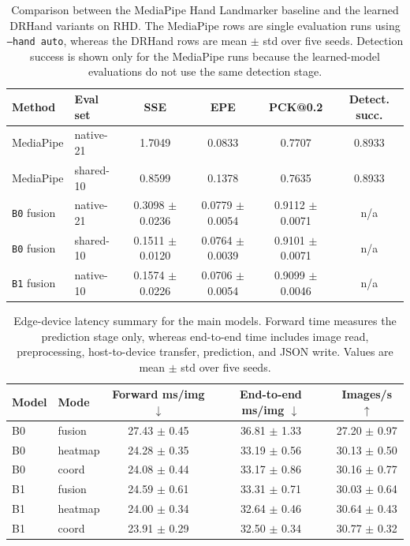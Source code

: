 \documentclass[10pt,letterpaper]{article}
\begin{document}
\begin{table}[H]
\centering
\footnotesize
\caption{Comparison between the MediaPipe Hand Landmarker baseline and the learned DRHand variants on RHD. The MediaPipe rows are single evaluation runs using \texttt{--hand auto}, whereas the DRHand rows are mean $\pm$ std over five seeds. Detection success is shown only for the MediaPipe runs because the learned-model evaluations do not use the same detection stage.}
\label{tab:mediapipe_baseline}
\begin{tabular}{llcccc}
\toprule
Method & Eval set & SSE & EPE & PCK@0.2 & Detect. succ. \\
\midrule
MediaPipe & native-21 & 1.7049 & 0.0833 & 0.7707 & 0.8933 \\
MediaPipe & shared-10 & 0.8599 & 0.1378 & 0.7635 & 0.8933 \\
\texttt{B0} fusion & native-21 & 0.3098 $\pm$ 0.0236 & 0.0779 $\pm$ 0.0054 & 0.9112 $\pm$ 0.0071 & n/a \\
\texttt{B0} fusion & shared-10 & 0.1511 $\pm$ 0.0120 & 0.0764 $\pm$ 0.0039 & 0.9101 $\pm$ 0.0071 & n/a \\
\texttt{B1} fusion & native-10 & 0.1574 $\pm$ 0.0226 & 0.0706 $\pm$ 0.0054 & 0.9099 $\pm$ 0.0046 & n/a \\
\bottomrule
\end{tabular}
\end{table}

\begin{table}[H]
\centering
\footnotesize
\caption{Edge-device latency summary for the main models. Forward time measures the prediction stage only, whereas end-to-end time includes image read, preprocessing, host-to-device transfer, prediction, and JSON write. Values are mean $\pm$ std over five seeds.}
\label{tab:latency}
\begin{tabular}{llccc}
\toprule
Model & Mode & Forward ms/img $\downarrow$ & End-to-end ms/img $\downarrow$ & Images/s $\uparrow$ \\
\midrule
B0 & fusion & 27.43 $\pm$ 0.45 & 36.81 $\pm$ 1.33 & 27.20 $\pm$ 0.97 \\
B0 & heatmap & 24.28 $\pm$ 0.35 & 33.19 $\pm$ 0.56 & 30.13 $\pm$ 0.50 \\
B0 & coord & 24.08 $\pm$ 0.44 & 33.17 $\pm$ 0.86 & 30.16 $\pm$ 0.77 \\
B1 & fusion & 24.59 $\pm$ 0.61 & 33.31 $\pm$ 0.71 & 30.03 $\pm$ 0.64 \\
B1 & heatmap & 24.00 $\pm$ 0.34 & 32.64 $\pm$ 0.46 & 30.64 $\pm$ 0.43 \\
B1 & coord & 23.91 $\pm$ 0.29 & 32.50 $\pm$ 0.34 & 30.77 $\pm$ 0.32 \\
\bottomrule
\end{tabular}
\end{table}
\end{document}
